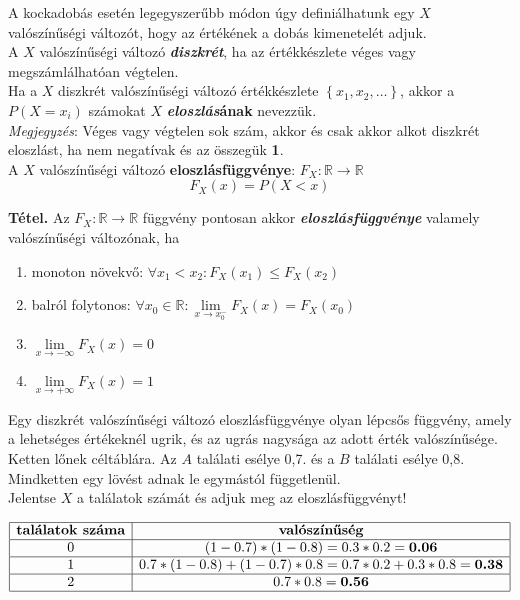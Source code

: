 \documentclass[tikz,12pt,margin=0px]{article}
\begin{document}
    \noindent A kockadobás esetén legegyszerűbb módon úgy definiálhatunk egy $X$ valószínűségi változót, hogy az értékének a dobás kimenetelét adjuk.\\

    \noindent A $X$ valószínűségi változó \textbf{\emph{diszkrét}}, ha az értékkészlete véges vagy megszámlálhatóan végtelen.\\

    \noindent Ha a $X$ diszkrét valószínűségi változó értékkészlete $\left\{x_1, x_2, \ldots\right\}$, akkor a $P(X = x_i)$ számokat $X$ \textbf{\emph{eloszlás}ának} nevezzük.\\

    \noindent \textit{Megjegyzés}: Véges vagy végtelen sok szám, akkor és csak akkor alkot diszkrét eloszlást, ha nem negatívak és az összegük \textbf{1}.\\
    
    \noindent A $X$ valószínűségi változó \textbf{eloszlásfüggvénye}: $F_{X}: \mathbb{R} \to \mathbb{R}$
    \[
        F_{X}(x)= P(X < x)
    \]

    \noindent \textbf{Tétel.} Az $F_{X}: \mathbb{R} \to \mathbb{R}$ függvény pontosan akkor \textbf{\emph{eloszlásfüggvénye}} valamely valószínűségi változónak, ha
	\begin{enumerate}
		\item monoton növekvő: $\forall x_1 < x_2: F_{X}(x_1) \leq F_{X}(x_2)$
		\item balról folytonos: $\forall x_0 \in \mathbb{R}: \lim\limits_{x \to x_0^{-}}F_{X}(x) = F_{X}(x_0)$
		\item $\lim\limits_{x \to -\infty}{F_{X}(x)} = 0$
        \item $\lim\limits_{x \to +\infty}{F_{X}(x)} = 1$
	\end{enumerate}

    \noindent Egy diszkrét valószínűségi változó eloszlásfüggvénye olyan lépcsős függvény, amely a lehetséges értékeknél ugrik, és az ugrás nagysága az adott érték valószínűsége.\\
    
    \noindent Ketten lőnek céltáblára. Az $A$ találati esélye 0,7. és a $B$ találati esélye 0,8.\\
    Mindketten egy lövést adnak le egymástól függetlenül.\\
    Jelentse $X$ a találatok számát és adjuk meg az eloszlásfüggvényt!

    \begin{center}
    $\begin{array}{|c|c|}
        \hline
        \textbf{találatok száma} & \textbf{valószínűség} \\ \hline
        0 & (1-0.7) * (1-0.8) = 0.3 * 0.2 = \textbf{0.06} \\ \hline
        1 & 0.7 * (1 - 0.8) + (1-0.7) * 0.8 = 0.7*0.2 + 0.3*0.8 = \textbf{0.38}  \\ \hline
        2 & 0.7 * 0.8 = \textbf{0.56} \\ \hline
      \end{array}$\\
    \end{center}
\end{document}
